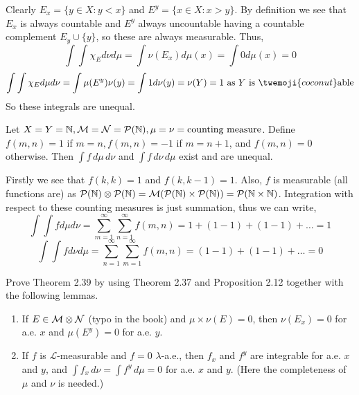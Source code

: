 \documentclass[12pt,a4paper]{article}
\begin{document}
\begin{solution}
	Clearly $E_x=\{y\in X:y<x\}$ and $E^y=\{x\in X:x>y\}$. 
	By definition we see that $E_x$ is always countable and $E^y$ always uncountable having a countable complement $E_y\cup\{y\}$, so these are always measurable.
	Thus,
	\[
	    \int\int\chi_Ed\nu d\mu=\int\nu(E_x)d\mu(x)=\int 0d\mu(x)=0
	\]
	\[
		\int\int\chi_Ed\mu d\nu=\int\mu(E^y)\nu(y)=\int 1d\nu(y)=\nu(Y)=1\text{ as }Y\text{ is }\twemoji{coconut}\text{able}
	\]
	So these integrals are unequal.	
\end{solution}
\begin{problem}\label{prob:2-48}
Let $X = Y = \mathbb{N}, \mathcal{M} = \mathcal{N} = \mathcal{P}(\mathbb{N}), \mu = \nu = \text{counting measure}$. Define $f(m, n) = 1$ if $m = n, f(m, n) = -1$ if $m = n + 1$, and $f(m, n) = 0$ otherwise. Then $\int f \, d\mu \, d\nu$ and $\int f \, d\nu \, d\mu$ exist and are unequal.
\end{problem}
\begin{solution}
    Firstly we see that $f(k,k)=1$ and $f(k,k-1)=1$. Also, $f$ is measurable (all functions are) as $\mathcal P(\mathbb{N})\otimes\mathcal P(\mathbb{N})=\mathcal M(\mathcal P(\mathbb{N})\times\mathcal P(\mathbb{N}))=\mathcal P(\mathbb{N}\times\mathbb{N})$. Integration with respect to these counting measures is just summation, thus we can write,
	\[
		\int\int fd\mu d\nu=\sum_{m=1}^\infty\sum_{n=1}^\infty f(m,n)=1+(1-1)+(1-1)+\ldots=1
	\]
	\[
		\int\int fd\nu d\mu=\sum_{n=1}^\infty\sum_{m=1}^\infty f(m,n)=(1-1)+(1-1)+\ldots=0
	\]
		
\end{solution}
\begin{problem}\label{prob:2-49}
Prove Theorem 2.39 by using Theorem 2.37 and Proposition 2.12 together with the following lemmas.
\begin{enumerate}[label=\alph*.]
    \item If $E \in \mathcal{M} \otimes \mathcal{N}$ (typo in the book) and $\mu \times \nu(E) = 0$, then $\nu(E_x) = 0$ for a.e. $x$ and $\mu(E^y) = 0$ for a.e. $y$.
    \item If $f$ is $\mathcal L$-measurable and $f = 0$ $\lambda$-a.e., then $f_x$ and $f^y$ are integrable for a.e. $x$ and $y$, and $\int f_x \, d\nu = \int f^y \, d\mu = 0$ for a.e. $x$ and $y$. (Here the completeness of $\mu$ and $\nu$ is needed.)
\end{enumerate}
\end{problem}
\end{document}
